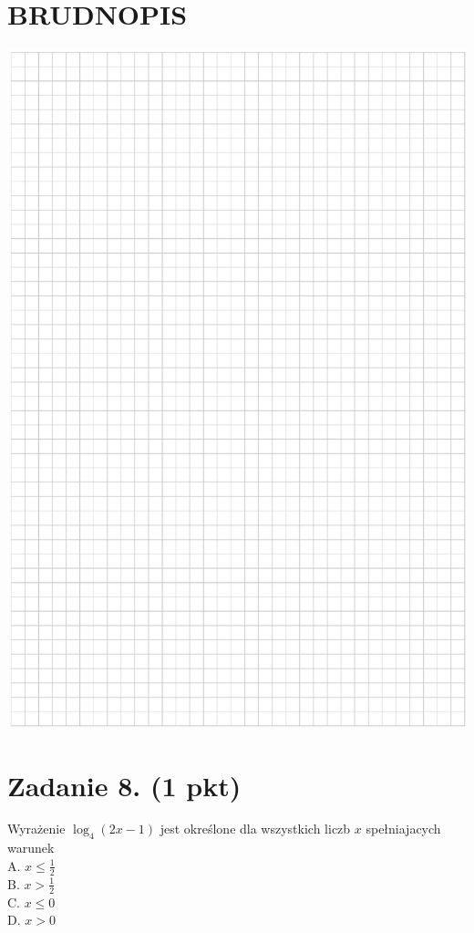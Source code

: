 \documentclass[10pt]{article}
\begin{document}
\section*{BRUDNOPIS}
\begin{center}
\includegraphics[max width=\textwidth]{2024_11_21_5b6b7ffa9006e3f448adg-03}
\end{center}

\section*{Zadanie 8. (1 pkt)}
Wyrażenie \(\log _{4}(2 x-1)\) jest określone dla wszystkich liczb \(x\) spełniajacych warunek\\
A. \(x \leq \frac{1}{2}\)\\
B. \(x>\frac{1}{2}\)\\
C. \(x \leq 0\)\\
D. \(x>0\)
\end{document}
